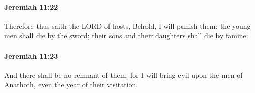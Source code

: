 		\paragraph{Jeremiah 11:22} %
			\label{JEREMIAH-11-22}

			Therefore thus saith the LORD of hosts, Behold, I will punish them: the young men shall die by the sword; their sons and their daughters shall die by famine:


		\paragraph{Jeremiah 11:23} %
			\label{JEREMIAH-11-23}

			And there shall be no remnant of them: for I will bring evil upon the men of Anathoth, even the year of their visitation.

